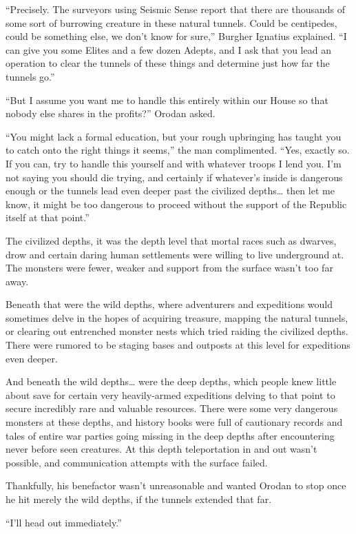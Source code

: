 \documentclass[a4paper,10pt]{book}
\begin{document}
“Precisely. The surveyors using Seismic Sense report that there are thousands of some sort of burrowing creature in these natural tunnels. Could be centipedes, could be something else, we don’t know for sure,” Burgher Ignatius explained. “I can give you some Elites and a few dozen Adepts, and I ask that you lead an operation to clear the tunnels of these things and determine just how far the tunnels go.”\par
“But I assume you want me to handle this entirely within our House so that nobody else shares in the profits?” Orodan asked.\par
“You might lack a formal education, but your rough upbringing has taught you to catch onto the right things it seems,” the man complimented. “Yes, exactly so. If you can, try to handle this yourself and with whatever troops I lend you. I’m not saying you should die trying, and certainly if whatever’s inside is dangerous enough or the tunnels lead even deeper past the civilized depths… then let me know, it might be too dangerous to proceed without the support of the Republic itself at that point.”\par
The civilized depths, it was the depth level that mortal races such as dwarves, drow and certain daring human settlements were willing to live underground at. The monsters were fewer, weaker and support from the surface wasn’t too far away.\par
Beneath that were the wild depths, where adventurers and expeditions would sometimes delve in the hopes of acquiring treasure, mapping the natural tunnels, or clearing out entrenched monster nests which tried raiding the civilized depths. There were rumored to be staging bases and outposts at this level for expeditions even deeper.\par
And beneath the wild depths… were the deep depths, which people knew little about save for certain very heavily-armed expeditions delving to that point to secure incredibly rare and valuable resources. There were some very dangerous monsters at these depths, and history books were full of cautionary records and tales of entire war parties going missing in the deep depths after encountering never before seen creatures. At this depth teleportation in and out wasn’t possible, and communication attempts with the surface failed.\par
Thankfully, his benefactor wasn’t unreasonable and wanted Orodan to stop once he hit merely the wild depths, if the tunnels extended that far.\par
“I’ll head out immediately.”\par
\end{document}

